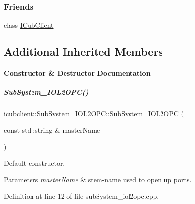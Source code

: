 \subsubsection*{Friends}
\begin{DoxyCompactItemize}
\item 
class \hyperlink{group__icubclient__subsystems_a56c42753f30380d8abf4a96bc322b3b0}{I\+Cub\+Client}
\end{DoxyCompactItemize}
\subsection*{Additional Inherited Members}


\paragraph{Constructor \& Destructor Documentation}
\mbox{\label{group__icubclient__subsystems_ae59e5eea9897cea515d5b28a2ad57734}} 
\subparagraph{\texorpdfstring{Sub\+System\+\_\+\+I\+O\+L2\+O\+P\+C()}{SubSystem\_IOL2OPC()}}
{\footnotesize\ttfamily icubclient\+::\+Sub\+System\+\_\+\+I\+O\+L2\+O\+P\+C\+::\+Sub\+System\+\_\+\+I\+O\+L2\+O\+PC (\begin{DoxyParamCaption}\item[{const std\+::string \&}]{master\+Name }\end{DoxyParamCaption})}



Default constructor. 


\begin{DoxyParams}{Parameters}
{\em master\+Name} & stem-\/name used to open up ports. \\
\hline
\end{DoxyParams}


Definition at line 12 of file sub\+System\+\_\+iol2opc.\+cpp.



